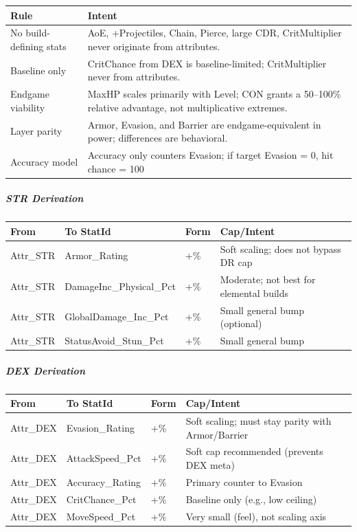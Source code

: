 \begin{tabular}{l|p{10cm}}
	\textbf{Rule} & \textbf{Intent} \\ \hline
	No build-defining stats & AoE, +Projectiles, Chain, Pierce, large CDR, CritMultiplier never originate from attributes. \\
	Baseline only & CritChance from DEX is baseline-limited; CritMultiplier never from attributes. \\
	Endgame viability & MaxHP scales primarily with Level; CON grants a 50–100\% relative advantage, not multiplicative extremes. \\
	Layer parity & Armor, Evasion, and Barrier are endgame-equivalent in power; differences are behavioral. \\
	Accuracy model & Accuracy only counters Evasion; if target Evasion = 0, hit chance = 100%
\end{tabular}

\subparagraph{STR Derivation}
\begin{tabular}{l|l|l|l}
	\textbf{From} & \textbf{To StatId} & \textbf{Form} & \textbf{Cap/Intent} \\ \hline
	Attr\_STR & Armor\_Rating & +\% & Soft scaling; does not bypass DR cap \\
	Attr\_STR & DamageInc\_Physical\_Pct & +\% & Moderate; not best for elemental builds \\
	Attr\_STR & GlobalDamage\_Inc\_Pct & +\% & Small general bump (optional) \\
	Attr\_STR & StatusAvoid\_Stun\_Pct & +\% & Small general bump \\
\end{tabular}

\subparagraph{DEX Derivation}
\begin{tabular}{l|l|l|l}
	\textbf{From} & \textbf{To StatId} & \textbf{Form} & \textbf{Cap/Intent} \\ \hline
	Attr\_DEX & Evasion\_Rating & +\% & Soft scaling; must stay parity with Armor/Barrier \\
	Attr\_DEX & AttackSpeed\_Pct & +\% & Soft cap recommended (prevents DEX meta) \\
	Attr\_DEX & Accuracy\_Rating & +\% & Primary counter to Evasion \\
	Attr\_DEX & CritChance\_Pct & +\% & Baseline only (e.g., low ceiling) \\
	Attr\_DEX & MoveSpeed\_Pct & +\% & Very small (feel), not scaling axis \\
\end{tabular}

